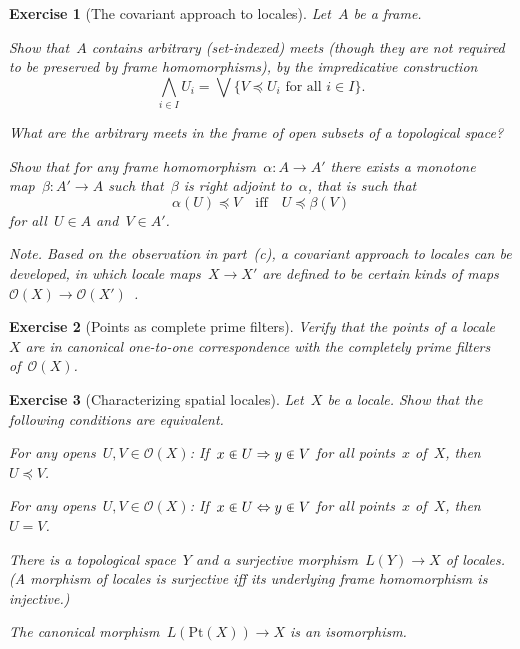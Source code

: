 \documentclass{ws-rv9x6}
\newtheorem{ex}{Exercise}
\newenvironment{exercise}[1]{
  \begin{ex}[#1]
}{\end{ex}}
\renewcommand{\O}{\mathcal{O}}
\renewcommand{\_}{\mathpunct{.}}
\newcommand{\?}{\,{:}\,}
\newcommand{\Pt}{\mathrm{Pt}}
\begin{document}
\begin{exercise}{The covariant approach to locales}%
Let~$A$ be a frame.
\begin{alphlist}[(c)]
\item Show that~$A$ contains arbitrary (set-indexed) meets (though they are not
required to be preserved by frame homomorphisms), by the impredicative
construction
\[ \bigwedge_{i \in I} U_i = \bigvee\{ \text{$V \preceq U_i$ for all~$i \in I$}
\}. \]
\item What are the arbitrary meets in the frame of open subsets of a
topological space?
\item Show that for any frame homomorphism~$\alpha : A \to A'$ there exists a
monotone map~$\beta : A' \to A$ such that~\emph{$\beta$ is right adjoint
to~$\alpha$}, that is such that
\[ \alpha(U) \preceq V \quad\text{iff}\quad U \preceq \beta(V) \]
for all~$U \in A$ and~$V \in A'$.
\end{alphlist}
{\scriptsize\emph{Note.} Based on the observation in part~(c), a
\emph{covariant approach} to locales can be developed, in which locale maps~$X
\to X'$ are defined to be certain kinds of maps~$\O(X) \to
\O(X')$~\cite{picado-pultr:covariant}.\par}
\end{exercise}

\begin{exercise}{Points as complete prime filters}%
\label{ex:points-as-filters}%
Verify that the points of a locale~$X$ are in canonical one-to-one correspondence
with the completely prime filters of~$\O(X)$.
\end{exercise}

\begin{exercise}{Characterizing spatial locales}%
Let~$X$ be a locale. Show that the following conditions are equivalent.
\begin{alphlist}[(c)]
\item For any opens~$U, V \in \O(X)$: If~$x \inplus U \Rightarrow y \inplus V$
for all points~$x$ of~$X$, then~$U \preceq V$.
\item For any opens~$U, V \in \O(X)$: If~$x \inplus U \Leftrightarrow y \inplus V$
for all points~$x$ of~$X$, then~$U = V$.
\item There is a topological space~$Y$ and a surjective morphism~$L(Y) \to X$
of locales. (A morphism of locales is \emph{surjective} iff its underlying
frame homomorphism is injective.)
\item The canonical morphism~$L(\Pt(X)) \to X$ is an isomorphism.
\end{alphlist}
\end{exercise}
\end{document}
